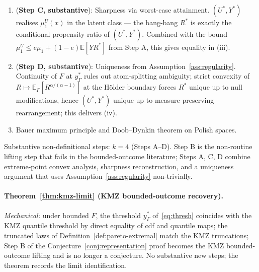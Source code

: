 \documentclass[11pt]{article}
\newcommand{\E}{\mathbb{E}}
\theoremstyle{definition}
\theoremstyle{plain}
\theoremstyle{remark}
\begin{document}
\begin{enumerate}[label=(\arabic*)]
  \item[$\leftarrow$] (\textbf{Step C, substantive}): Sharpness via worst-case attainment. $(U^*, Y^*)$ realises $\mu_1^U(x)$ in the latent class --- the bang-bang $R^*$ is exactly the conditional propensity-ratio of $(U^*, Y^*)$. Combined with the bound $\mu_1^U \le e \mu_1 + (1-e) \E[Y R^*]$ from Step A, this gives equality in (iii).
  \item[$\leftarrow$] (\textbf{Step D, substantive}): Uniqueness from Assumption~\ref{ass:regularity}. Continuity of $F$ at $y_\Gamma^*$ rules out atom-splitting ambiguity; strict convexity of $R \mapsto \E_F[R^{\alpha/(\alpha-1)}]$ at the H\"older boundary forces $R^*$ unique up to null modifications, hence $(U^*, Y^*)$ unique up to measure-preserving rearrangement; this delivers (iv).
  \item[$\leftarrow$] [\emph{classical}] Bauer maximum principle and Doob--Dynkin theorem on Polish spaces.
\end{enumerate}
Substantive non-definitional steps: $k = 4$ (Steps A--D). Step B is the non-routine lifting step that fails in the bounded-outcome literature; Steps A, C, D combine extreme-point convex analysis, sharpness reconstruction, and a uniqueness argument that uses Assumption~\ref{ass:regularity} non-trivially.

\paragraph{Theorem~\ref{thm:kmz-limit} (KMZ bounded-outcome recovery).} \emph{Mechanical:} under bounded $F$, the threshold $y_\Gamma^*$ of~\eqref{eq:thresh} coincides with the KMZ quantile threshold by direct equality of cdf and quantile maps; the truncated laws of Definition~\ref{def:pareto-extremal} match the KMZ truncations; Step B of the Conjecture~\ref{conj:representation} proof becomes the KMZ bounded-outcome lifting and is no longer a conjecture. No substantive new steps; the theorem records the limit identification.
\end{document}
